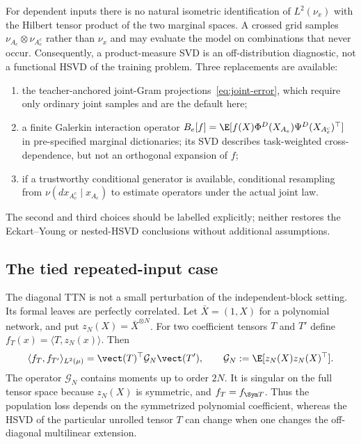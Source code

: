 For dependent inputs there is no natural isometric identification of $L^2(\nu_x)$ with the Hilbert
tensor product of the two marginal spaces.  A crossed grid samples
$\nu_{A_e}\otimes\nu_{A_e^c}$ rather than $\nu_x$ and may evaluate the model on combinations that
never occur.  Consequently, a product-measure SVD is an off-distribution diagnostic, not a
functional HSVD of the training problem.  Three replacements are available:
\begin{enumerate}[label=(\alph*),nosep]
\item the teacher-anchored joint-Gram projections~\eqref{eq:joint-error}, which require only
      ordinary joint samples and are the default here;
\item a finite Galerkin interaction operator
      $B_e[f]=\E[f(X)\Phi^D(X_{A_e})\Psi^D(X_{A_e^c})^\top]$ in pre-specified marginal
      dictionaries; its SVD describes task-weighted cross-dependence, but not an orthogonal
      expansion of $f$;
\item if a trustworthy conditional generator is available, conditional resampling from
      $\nu(dx_{A_e^c}\mid x_{A_e})$ to estimate operators under the actual joint law.
\end{enumerate}
The second and third choices should be labelled explicitly; neither restores the Eckart--Young or
nested-HSVD conclusions without additional assumptions.

\subsection{The tied repeated-input case}\label{sec:repeated-input}

The diagonal TTN is not a small perturbation of the independent-block setting.  Its formal leaves
are perfectly correlated.  Let $\bar X=(1,X)$ for a polynomial network, and put
$z_N(X)=\bar X^{\otimes N}$.  For two coefficient tensors $T$ and $T'$ define
$f_T(x)=\langle T,z_N(x)\rangle$.  Then
\begin{equation}\label{eq:moment-operator}
 \langle f_T,f_{T'}\rangle_{L^2(\mu)}
 =\vect(T)^\top\mathcal G_N\vect(T'),
 \qquad
 \mathcal G_N:=\E[z_N(X)z_N(X)^\top].
\end{equation}
The operator $\mathcal G_N$ contains moments up to order $2N$.  It is singular on the full tensor
space because $z_N(X)$ is symmetric, and
$f_T=f_{\Sym T}$.  Thus the population loss depends on the symmetrized polynomial coefficient,
whereas the HSVD of the particular unrolled tensor $T$ can change when one changes the off-diagonal
multilinear extension.

